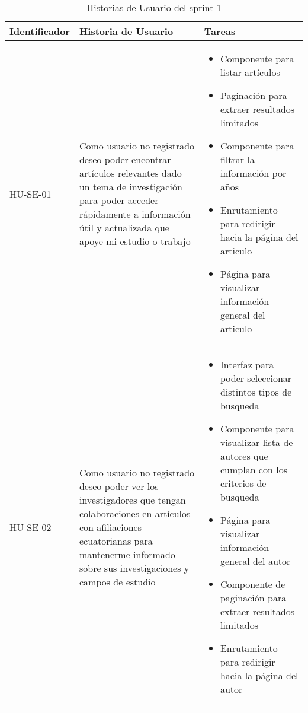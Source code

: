 \begin{table}[H]
    \centering
    \begin{tabular}{|p{2.5cm}|p{5cm}|p{6cm}|}
        \midrule
        \textbf{Identificador} & \textbf{Historia de Usuario}                                                                                                                                                                               & \textbf{Tareas} \\

        \hline
        HU-SE-01 & Como usuario no registrado deseo poder encontrar artículos relevantes dado un  tema de investigación para poder acceder rápidamente a información útil y actualizada que apoye mi estudio o trabajo        &
        \begin{itemize}
            \item Componente para listar \break artículos
            \item Paginación para extraer resultados limitados
            \item Componente para filtrar la \break información por años
            \item Enrutamiento para redirigir hacia la página del articulo
            \item Página para visualizar \break información general del articulo
        \end{itemize}
        \\
        \hline
        HU-SE-02 & Como usuario no registrado deseo poder ver los investigadores que tengan colaboraciones en artículos con afiliaciones ecuatorianas para mantenerme informado sobre sus investigaciones y campos de estudio &
        \begin{itemize}
            \item Interfaz para poder seleccionar distintos tipos de busqueda
            \item Componente para visualizar lista de autores que cumplan con los criterios de busqueda
            \item Página para visualizar información general del autor
            \item Componente de paginación para extraer resultados limitados
            \item Enrutamiento para redirigir hacia la página del autor
        \end{itemize}
        \\
        \hline
        
    \end{tabular}
    \caption{Historias de Usuario del sprint 1}
    \label{C2T1:Historias de Usuario del Sprint 1}
\end{table}